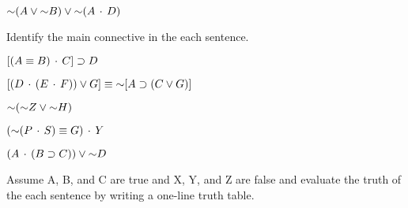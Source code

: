 \begin{exercises}

\item {}

\item {}	{$\mathord{\sim}(A \vee \mathord{\sim} B) \vee \mathord{\sim}(A \,\cdot\, D)$}
	
\item {}	

\item {}  

\item {} 
\end{exercises}

\noindent\problempart Identify the main connective in the each sentence.
\begin{exercises}

\item $[(A \equiv B) \,\cdot\, C] \supset D$  %

\item $[(D \,\cdot\, (E \,\cdot\, F)) \vee G] \equiv  \mathord{\sim} [A \supset (C \vee G)] $ %

\item $\mathord{\sim} (\mathord{\sim} Z \vee \mathord{\sim} H) $ %

\item $(\mathord{\sim} (P \,\cdot\, S) \equiv G) \,\cdot\, Y $ %

\item $(A \,\cdot\, (B \supset C)) \vee \mathord{\sim} D	$  %

\end{exercises}

\noindent\problempart Assume A, B, and C are true and X, Y, and Z are false and evaluate the truth of the each sentence by writing a one-line truth table.

